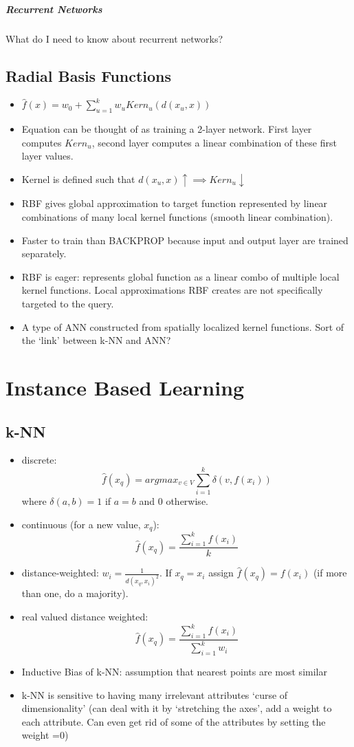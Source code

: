 \documentclass[11pt]{article}
\begin{document}
\subparagraph{Recurrent Networks}
What do I need to know about recurrent networks?

\subsection{Radial Basis Functions}
\begin{itemize}
\item $\hat{f}(x) = w_0+ \sum_{u=1}^k{w_uKern_u(d(x_u, x))}$
\item Equation can be thought of as training a 2-layer network. First layer computes $Kern_u$, second layer computes a linear combination of these first layer values.
\item Kernel is defined such that $d(x_u, x) \uparrow \implies Kern_u \downarrow$
\item RBF gives global approximation to target function represented by linear combinations of many local kernel functions (smooth linear combination).
\item Faster to train than \textsc{BACKPROP} because input and output layer are trained separately.
\item RBF is eager: represents global function as a linear combo of multiple local kernel functions. Local approximations RBF creates are not specifically targeted to the query.
\item A type of ANN constructed from spatially localized kernel functions. Sort of the `link' between k-NN and ANN?
\end{itemize}


\section{Instance Based Learning}
\subsection{k-NN}
\begin{itemize}
\item discrete: $$\hat{f} (x_q) =argmax_{v \in V} \sum_{i=1}^k{\delta(v, f(x_i))}$$ where $\delta(a,b) =1$ if $a=b$ and $0$ otherwise.
\item continuous (for a new value, $x_q$): $$\hat{f} (x_q) = \frac{\sum_{i=1}^{k}{f(x_i)}}{k}$$
\item distance-weighted: $w_i = \frac{1}{d(x_q, x_i)^2}$. If $x_q = x_i$ assign $\hat{f} (x_q) = f(x_i)$ (if more than one, do a majority).
\item real valued distance weighted: $$\hat{f} (x_q) = \frac{\sum_{i=1}^{k}{f(x_i)}}{\sum_{i=1}^{k}{w_i}}$$
\item  Inductive Bias of k-NN: assumption that nearest points are most similar
\item k-NN is sensitive to having many irrelevant attributes `curse of dimensionality' (can deal with it by `stretching the axes', add a weight to each attribute. Can even get rid of some of the attributes by setting the weight =0)
\end{itemize}
\end{document}
